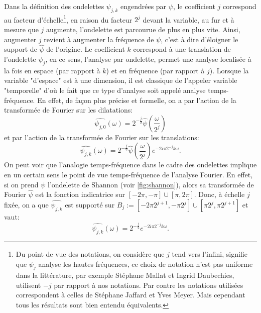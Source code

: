 \begin{remarque}
	Dans la définition des ondelettes $\psi_{j,k}$ engendrées par $\psi$, le coefficient $j$ correspond au facteur d'échelle\footnote{Du point de vue des notations, on considère que $j$ tend vers l'infini, signifie que $\psi_j$ analyse les hautes fréquences, ce choix de notation n'est pas uniforme dans la littérature, par exemple Stéphane Mallat et Ingrid Daubechies, utilisent $-j$ par rapport à nos notations. Par contre les notations utilisées correspondent à celles de Stéphane Jaffard et Yves Meyer. Mais cependant tous les résultats sont bien entendu équivalents.},
	en raison du facteur $2^j$ devant la variable, au fur et à mesure que $j$ augmente, l'ondelette est parcourue de plus en plus vite. Ainsi, augmenter $j$ revient à augmenter la fréquence de $\psi$, c'est à dire d'éloigner le support de $\hat{\psi}$ de l'origine. 
	Le coefficient $k$ correspond à une translation de l'ondelette $\psi_j$, en ce sens, l'analyse par ondelette, permet une analyse localisée à la fois en espace (par rapport à $k$) et en fréquence (par rapport à $j$).
	Lorsque la variable "d'espace" est à une dimension, il est classique de l'appeler variable "temporelle" d'où le fait que ce type d'analyse soit appelé analyse temps-fréquence. 
	\newline 
	En effet, de façon plus précise et formelle, on a par l'action de la transformée de Fourier sur les dilatations: 
	\begin{equation}
		\widehat{\psi_{j,0}}(\omega) = 2^{-\frac{j}{2}}\hat{\psi}(\frac{\omega}{2^j})
	\end{equation}
	et par l'action de la transformée de Fourier sur les translations:
	\begin{equation}
		\widehat{\psi_{j,k}}(\omega) = 2^{-\frac{j}{2}}\hat{\psi}(\frac{\omega}{2^j})e^{-2i\pi 2^{-j}k\omega}.
	\end{equation}
	On peut voir que l'analogie temps-fréquence dans le cadre des ondelettes implique en un certain sens le point de vue temps-fréquence de l'analyse Fourier.
	En effet, si on prend $\psi$ l'ondelette de Shannon (voir \ref{fig:shannon}), alors sa transformée de Fourier $\hat{\psi}$ est la fonction indicatrice sur $[-2\pi, -\pi]\cup[\pi, 2\pi]$.
	Donc, à échelle $j$ fixée, on a que $\widehat{\psi_{j,k}}$ est supporté sur $B_j := [-2\pi2^{j+1}, -\pi2^j]\cup[\pi2^j, \pi2^{j+1}]$ et vaut:
	\begin{equation}
		\widehat{\psi_{j,k}}(\omega) = 2^{-\frac{j}{2}}e^{-2i\pi 2^{-j}k\omega}.
	\end{equation}

\end{remarque}
